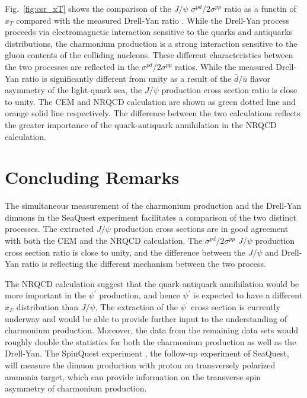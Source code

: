 \documentclass[10pt,a4paper,final]{article}
\begin{document}
Fig.~\ref{fig:csr_xT} shows the comparison of the $J/\psi$ $\sigma^{pd}/2\sigma^{pp}$ ratio
as a functin of $x_T$ compared with the measured Drell-Yan ratio \cite{dove2021}.
While the Drell-Yan process proceeds via electromagnetic interaction sensitive
to the quarks and antiquarks distributions, the charmonium production is a strong
interaction sensitive to the gluon contents of the colliding nucleons. These
different characteristics between the two processes are reflected in the
$\sigma^{pd}/2\sigma^{pp}$ ratios. While the measured Drell-Yan ratio
is significantly different from unity as a result of the $\bar{d}/\bar{u}$
flavor asymmetry of the light-quark sea, the $J/\psi$ production cross section ratio
is close to unity.
The CEM and NRQCD calculation are shown as green dotted line and orange solid line
respectively. The difference between the two calculations reflects the greater
importance of the quark-antiquark annihilation in the NRQCD calculation.

\section{Concluding Remarks}
The simultaneous measurement of the charmonium production and the Drell-Yan dimuons
in the SeaQuest experiment facilitates a comparison of the two distinct processes. The
extracted $J/\psi$ production cross sections are in good agreement with both the CEM
and the NRQCD calculation. The $\sigma^{pd}/2\sigma^{pp}$ $J/\psi$ production cross section ratio
is close to unity, and the difference between the $J/\psi$ and Drell-Yan
ratio is reflecting the different mechanism between the two process.

The NRQCD calculation suggest that the quark-antiquark annihilation would
be more important in the $\psi^\prime$ production, and hence $\psi^\prime$ is expected
to have a different $x_F$ distribution than $J/\psi$. The extraction of the $\psi^\prime$
cross section is currently underway and would be able to provide further input to
the understanding of charmonium production. Moreover, the data from the remaining
data sets would roughly double the statistics for both the charmonium production as well as the Drell-Yan.
The SpinQuest experiment \cite{geesaman2014}, the follow-up experiment of SeaQuest, will measure the dimuon
production with proton on transversely polarized ammonia target, which can provide information
on the transverse spin asymmetry of charmonium production.

\printbibliography[heading=bibintoc,title={References}]
\end{document}
